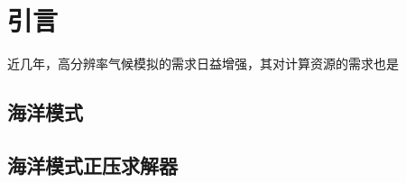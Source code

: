\chapter{引言}
\label{cha:intro}
近几年，高分辨率气候模拟的需求日益增强，其对计算资源的需求也是

\cite{kocher99}

\section{海洋模式}
\section{海洋模式正压求解器}

